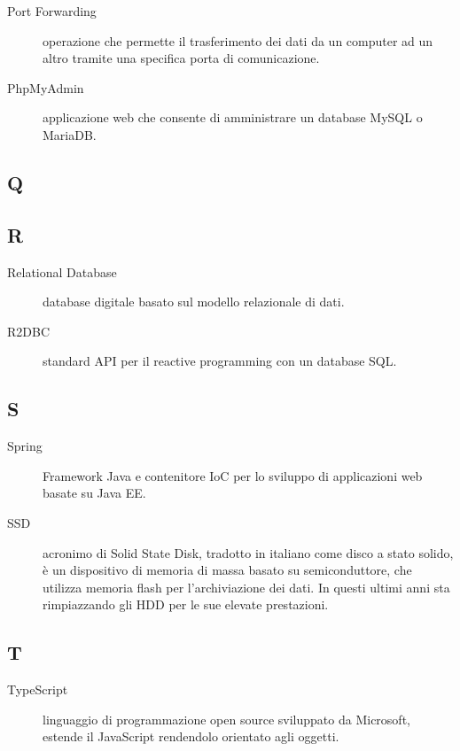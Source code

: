 \documentclass[../../../manuale.sviluppatore.tex]{subfiles}
\begin{document}
\begin{description}
    \item[Port Forwarding] operazione che permette il trasferimento dei dati da un computer ad un altro tramite una specifica porta di comunicazione.
    \item[PhpMyAdmin] applicazione web che consente di amministrare un database MySQL o MariaDB\@.
\end{description}

\subsection{Q}

\subsection{R}

\begin{description}
    \item[Relational Database] database digitale basato sul modello relazionale di dati.
    \item[R2DBC] standard API per il reactive programming con un database SQL\@.
\end{description}

\subsection{S}

\begin{description}
    \item[Spring] Framework Java e contenitore IoC per lo sviluppo di applicazioni web basate su Java EE\@.
    \item[SSD] acronimo di Solid State Disk, tradotto in italiano come disco a stato solido, è un dispositivo di memoria di massa basato su semiconduttore, che utilizza memoria flash per l'archiviazione dei dati. In questi ultimi anni sta rimpiazzando gli HDD per le sue elevate prestazioni.
\end{description}

\subsection{T}

\begin{description}
    \item[TypeScript] linguaggio di programmazione open source sviluppato da Microsoft, estende il JavaScript rendendolo orientato agli oggetti.
\end{description}
\end{document}
